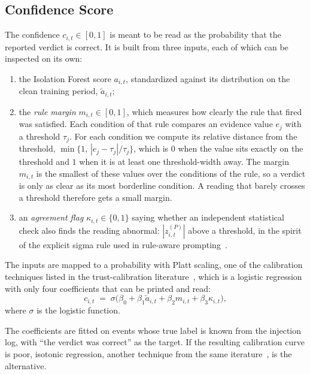 \documentclass[11pt,a4paper]{article}
\begin{document}
\subsection{Confidence Score}
\label{sec:confidence}
The confidence $c_{i,t}\in[0,1]$ is meant to be read as the probability that the reported verdict is
correct. It is built from three inputs, each of which can be inspected on its own:
\begin{enumerate}[leftmargin=*,itemsep=2pt]
  \item the Isolation Forest score $a_{i,t}$, standardized against its distribution on the clean training
        period, $\tilde a_{i,t}$;
  \item the \emph{rule margin} $m_{i,t}\in[0,1]$, which measures how clearly the rule that fired was
      satisfied. Each condition of that rule compares an evidence value $e_j$ with a threshold $\tau_j$.
      For each condition we compute its relative distance from the threshold,
      $\min\{1,\,|e_j-\tau_j|/\tau_j\}$, which is $0$ when the value sits exactly on the threshold and
      $1$ when it is at least one threshold-width away. The margin $m_{i,t}$ is the smallest of these
      values over the conditions of the rule, so a verdict is only as clear as its most borderline
      condition. A reading that barely crosses a threshold therefore gets a small margin.
  \item an \emph{agreement flag} $\kappa_{i,t}\in\{0,1\}$ saying whether an independent statistical check
        also finds the reading abnormal: $|z^{(P)}_{i,t}|$ above a threshold, in the spirit of the explicit
        sigma rule used in rule-aware prompting~\cite{ruleaware}.
\end{enumerate}
The inputs are mapped to a probability with Platt scaling, one of the calibration techniques listed in the trust-calibration literature~\cite{trustcal}, which is a logistic regression with only four coefficients that can be printed and read:
\begin{equation}
  c_{i,t}\;=\;\sigma\!\bigl(\beta_0+\beta_1\tilde a_{i,t}+\beta_2 m_{i,t}+\beta_3\kappa_{i,t}\bigr),
\end{equation}
where $\sigma$ is the logistic function. 

The coefficients are fitted on events whose true label is known from the injection log, with ``the verdict was correct'' as the target. If the resulting calibration curve is poor, isotonic regression, another technique from the same  iterature~\cite{trustcal}, is the alternative.
\end{document}
